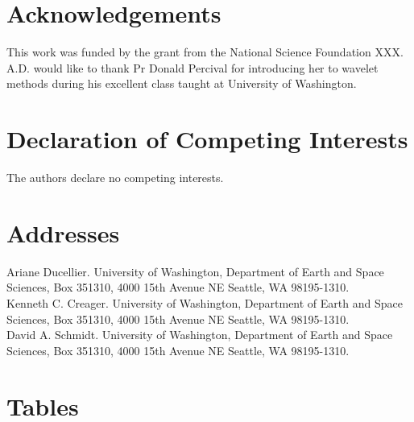 \documentclass{article}
\begin{document}
\section*{Acknowledgements}

This work was funded by the grant from the National Science Foundation XXX. A.D. would like to thank Pr Donald Percival for introducing her to wavelet methods during his excellent class taught at University of Washington.   

\section*{Declaration of Competing Interests}

The authors declare no competing interests.




\newpage

\section*{Addresses}

Ariane Ducellier. University of Washington, Department of Earth and Space Sciences, Box 351310, 4000 15th Avenue NE Seattle, WA 98195-1310. \\

Kenneth C. Creager. University of Washington, Department of Earth and Space Sciences, Box 351310, 4000 15th Avenue NE Seattle, WA 98195-1310. \\

David A. Schmidt. University of Washington, Department of Earth and Space Sciences, Box 351310, 4000 15th Avenue NE Seattle, WA 98195-1310.

\newpage

\section*{Tables}
\end{document}
